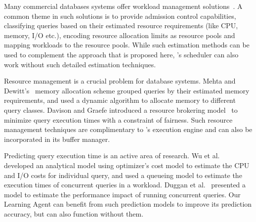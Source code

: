 Many commercial databases systems offer workload management solutions~\cite{res_gov, rm, DB2, teradatawm, gpdb, hpwm}.
A common theme in such solutions is to provide admission control capabilities, classifying queries based on their estimated resource requirements (like CPU, memory, I/O etc.), encoding resource allocation limits as resource pools and mapping workloads to the resource pools. 
While such estimation methods can be used to complement the approach that is proposed here, 
\sys{}'s scheduler can also work without such detailed estimation techniques. 

Resource management is a crucial problem for database systems. 
Mehta and Dewitt's~\cite{mehta1993dynamic} memory allocation scheme
grouped queries by their estimated memory requirements, and used a dynamic 
algorithm to allocate memory to different query classes. 
Davison and Graefe introduced a resource brokering model~\cite{davison1995dynamic} to minimize query execution times with a constraint of fairness. 
Such resource management techniques are complimentary to \sys{}'s execution engine 
and can also be incorporated in its buffer manager. 

Predicting query execution time is an active area of research. 
Wu et al.~\cite{wu2013towards, wu2014uncertainty} developed an analytical model using optimizer's cost model to estimate the CPU and I/O costs for individual query, and used a queueing model to estimate the execution times of concurrent queries in a workload. 
Duggan et al.~\cite{duggan2011performance} presented a model to estimate the performance impact of running concurrent queries.
Our Learning Agent can benefit from such prediction models to improve its prediction accuracy, but can also function without them. 

